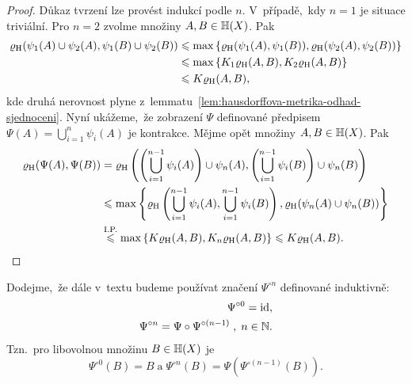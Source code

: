 \begin{proof}
    Důkaz tvrzení lze provést indukcí podle $n$. V~případě,~kdy $n=1$ je situace triviální. Pro $n=2$ zvolme množiny $A,B\in\mathbb{H}(X)$. Pak
    \begin{align*}
        \varrho_\textup{H}(\psi_1(A)\cup\psi_2(A),\psi_1(B)\cup\psi_2(B))&\leqslant\max\left\{\varrho_\textup{H}(\psi_1(A),\psi_1(B)),\varrho_\textup{H}(\psi_2(A),\psi_2(B))\right\}\\
        &\leqslant\max\left\{K_1\varrho_\textup{H}(A,B),K_2\varrho_\textup{H}(A,B)\right\}\\
        &\leqslant K\varrho_\textup{H}(A,B),
    \end{align*}
    kde druhá nerovnost plyne z~lemmatu~\ref{lem:hausdorffova-metrika-odhad-sjednoceni}. Nyní ukážeme,~že zobrazení $\Psi
    $ definované předpisem $\Psi(A)=\bigcup_{i=1}^n\psi_i(A)$ je kontrakce. Mějme opět množiny $A,B\in\mathbb{H}(X)$. Pak
    \begin{align*}
        \varrho_\textup{H}(\Psi(A),\Psi(B))&=\varrho_\textup{H}\left(\left(\bigcup_{i=1}^{n-1}\psi_i(A)\right)\cup\psi_n(A),\left(\bigcup_{i=1}^{n-1}\psi_i(B)\right)\cup\psi_n(B)\right)\\
        &\leqslant\max\left\{\varrho_\textup{H}\left(\bigcup_{i=1}^{n-1}\psi_i(A),\bigcup_{i=1}^{n-1}\psi_i(B)\right),\varrho_\textup{H}(\psi_n(A)\cup\psi_n(B))\right\}\\
        &\stackrel{\text{I.P.}}{\leqslant}\max\left\{K\varrho_\textup{H}(A,B),K_n\varrho_\textup{H}(A,B)\right\}\leqslant K\varrho_\textup{H}(A,B).
    \end{align*}
\end{proof}
\begin{remark}
    Dodejme,~že dále v~textu budeme používat značení $\Psi^{\circ n}$ definované induktivně:
    \begin{align*}
        \Psi^{\circ 0}=\operatorname{id},\\
        \Psi^{\circ n}=\Psi\circ\Psi^{\circ(n-1)}\;,\;n\in\mathbb{N}.
    \end{align*}
    Tzn.~pro libovolnou množinu $B\in\mathbb{H}(X)$ je
    \[\Psi^{\circ 0}(B)=B\;\text{a}\;\Psi^{\circ n}(B)=\Psi(\Psi^{\circ(n-1)}(B)).\]
\end{remark}

